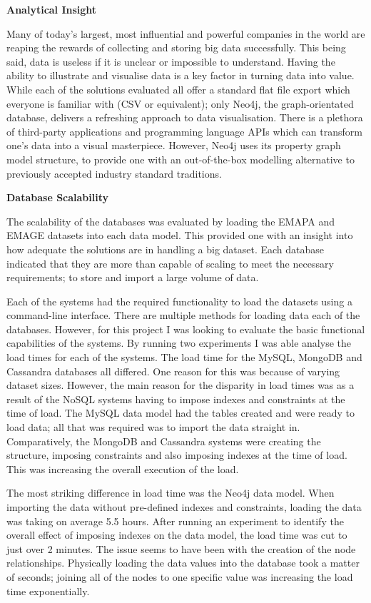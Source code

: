 \textbf{Analytical Insight}
\begin{addmargin}[2em]{0pt}
Many of today's largest, most influential and powerful companies in the world are reaping the rewards of collecting and storing big data successfully. This being said, data is useless if it is unclear or impossible to understand. Having the ability to illustrate and visualise data is a key factor in turning data into value. While each of the solutions evaluated all offer a standard flat file export which everyone is familiar with (CSV or equivalent); only Neo4j, the graph-orientated database, delivers a refreshing approach to data visualisation. There is a plethora of third-party applications and programming language APIs which can transform one's data into a visual masterpiece. However, Neo4j uses its property graph model structure, to provide one with an out-of-the-box modelling alternative to previously accepted industry standard traditions.
\end{addmargin}

\textbf{Database Scalability}
\begin{addmargin}[2em]{0pt}
The scalability of the databases was evaluated by loading the EMAPA and EMAGE datasets into each data model. This provided one with an insight into how adequate the solutions are in handling a big dataset. Each database indicated that they are more than capable of scaling to meet the necessary requirements; to store and import a large volume of data.

Each of the systems had the required functionality to load the datasets using a command-line interface. There are multiple methods for loading data each of the databases. However, for this project I was looking to evaluate the basic functional capabilities of the systems. By running two experiments I was able analyse the load times for each of the systems. The load time for the MySQL, MongoDB and Cassandra databases all differed. One reason for this was because of varying dataset sizes. However, the main reason for the disparity in load times was as a result of the NoSQL systems having to impose indexes and constraints at the time of load. The MySQL data model had the tables created and were ready to load data; all that was required was to import the data straight in. Comparatively, the MongoDB and Cassandra systems were creating the structure, imposing constraints and also imposing indexes at the time of load. This was increasing the overall execution of the load.

The most striking difference in load time was the Neo4j data model. When importing the data without pre-defined indexes and constraints, loading the data was taking on average 5.5 hours. After running an experiment to identify the overall effect of imposing indexes on the data model, the load time was cut to just over 2 minutes. The issue seems to have been with the creation of the node relationships. Physically loading the data values into the database took a matter of seconds; joining all of the nodes to one specific value was increasing the load time exponentially.\\[0.5em]
\end{addmargin}

